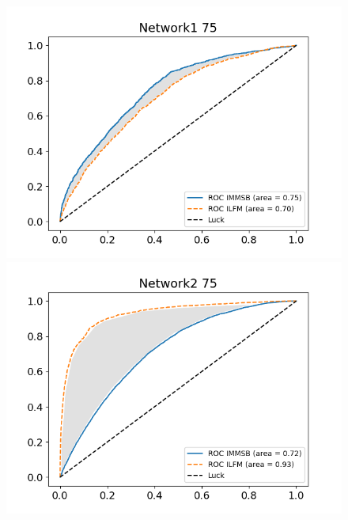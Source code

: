 \documentclass[journal]{IEEEtran}
\begin{document}
\begin{figure}[h]
\centering
    \begin{minipage}{0.24\textwidth}
        \includegraphics[width=\textwidth]{img/corpus/roc_network1_75_f}
    \end{minipage}
    \begin{minipage}{0.24\textwidth}
        \includegraphics[width=\textwidth]{img/corpus/roc_network2_75_f}
    \end{minipage}
    \begin{minipage}{0.5\textwidth}

\end{minipage}
\end{figure}
\end{document}
